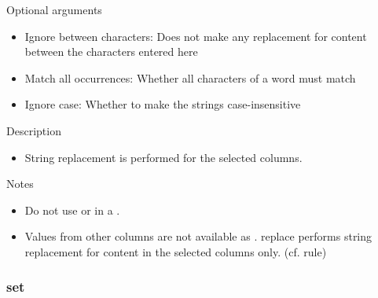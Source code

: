 \documentclass[letterpaper,10pt,english]{sphinxmanual}
\begin{document}
Optional arguments
\begin{itemize}
\item {} 
Ignore between characters: Does not make any replacement for content between the characters entered here

\item {} 
Match all occurrences: Whether all characters of a word must match

\item {} 
Ignore case: Whether to make the strings case-insensitive

\end{itemize}

Description
\begin{itemize}
\item {} 
String replacement is performed for the selected columns.

\end{itemize}

Notes
\begin{itemize}
\item {} 
Do not use  or \sphinxcode{\sphinxupquote{/}} in a .

\item {} 
Values from other columns are not available as . replace performs string replacement for content in the selected columns only. (cf. {\hyperref[\detokenize{discovery/part07/rule_kinds:set}]{}} rule)

\end{itemize}


\subsubsection{set}
\label{\detokenize{discovery/part07/rule_kinds:set}}
\begin{figure}[H]
\centering

\noindent{}
\end{figure}
\end{document}
